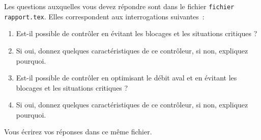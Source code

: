 Les questions auxquelles vous devez répondre sont dans le fichier {\tt fichier rapport.tex}. Elles correspondent aux interrogations suivantes~:
\begin{enumerate}
\item Est-il possible de contrôler en évitant les blocages et les situations critiques ?
\item Si oui, donnez quelques caractéristiques de ce contrôleur, si non, expliquez pourquoi.
\item Est-il possible de contrôler en optimisant le débit aval et en évitant les blocages et les situations critiques ?
\item Si oui, donnez quelques caractéristiques de ce contrôleur, si non, expliquez pourquoi.
\end{enumerate}

Vous écrirez vos réponses dans ce même fichier.


